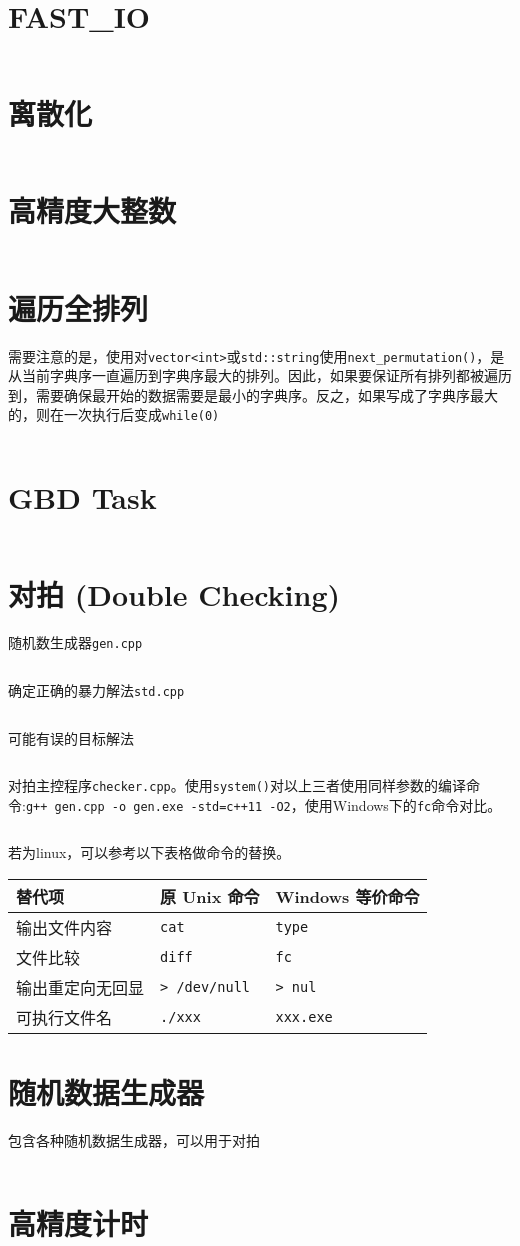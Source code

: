 \documentclass[openany,a4paper]{book}
\begin{document}
\section{FAST\_IO}
\inputminted{cpp}{Misc/fast_io.h}

\section{离散化}
\inputminted{cpp}{Misc/Discretize.h}

\section{高精度大整数}
\inputminted{cpp}{Misc/BigInt.h}

\section{遍历全排列}
需要注意的是，使用对\verb|vector<int>|或\verb|std::string|使用\verb|next_permutation()|，是从当前字典序一直遍历到字典序最大的排列。因此，如果要保证所有排列都被遍历到，需要确保最开始的数据需要是最小的字典序。反之，如果写成了字典序最大的，则在一次执行后变成\verb|while(0)|
\inputminted{cpp}{Misc/next_permutation.h}

\section{GBD Task}
\inputminted{json}{Misc/GDB-Task.json}

\section{对拍 (Double Checking)}
随机数生成器\verb|gen.cpp|
\inputminted{cpp}{Misc/DoubleChecking/gen.cpp}
确定正确的暴力解法\verb|std.cpp|
\inputminted{cpp}{Misc/DoubleChecking/gen.cpp}
可能有误的目标解法
\inputminted{cpp}{Misc/DoubleChecking/sol.cpp}
对拍主控程序\verb|checker.cpp|。使用\verb|system()|对以上三者使用同样参数的编译命令:\newline\verb|g++ gen.cpp -o gen.exe -std=c++11 -O2|，使用Windows下的\verb|fc|命令对比。
\inputminted{cpp}{Misc/DoubleChecking/checker.cpp}
若为linux，可以参考以下表格做命令的替换。\newline
\begin{tabular}{|l|l|l|}
    \hline
    替代项      & 原 Unix 命令            & Windows 等价命令     \\
    \hline
    输出文件内容   & \texttt{cat}         & \texttt{type}    \\
    文件比较     & \texttt{diff}        & \texttt{fc}      \\
    输出重定向无回显 & \texttt{> /dev/null} & \texttt{> nul}   \\
    可执行文件名   & \texttt{./xxx}       & \texttt{xxx.exe} \\
    \hline
\end{tabular}
\section{随机数据生成器}
包含各种随机数据生成器，可以用于对拍
\inputminted{cpp}{Misc/DoubleChecking/genlib.hpp}
\section{高精度计时}
\inputminted{cpp}{Misc/chrono.hpp}
\end{document}
